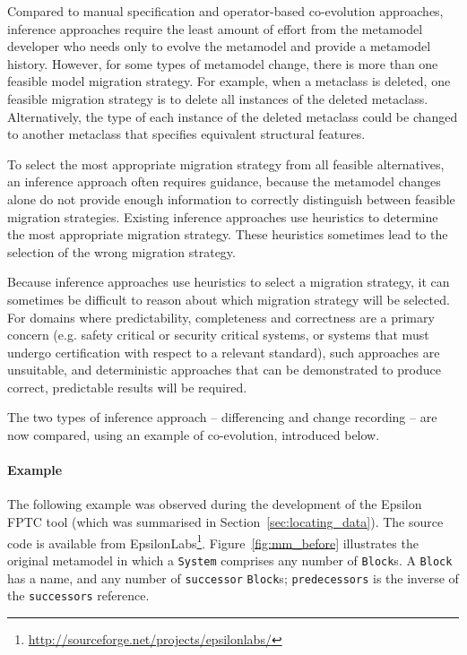 Compared to manual specification and operator-based co-evolution approaches, inference approaches require the least amount of effort from the metamodel developer who needs only to evolve the metamodel and provide a metamodel history. However, for some types of metamodel change, there is more than one feasible model migration strategy. For example, when a metaclass is deleted, one feasible migration strategy is to delete all instances of the deleted metaclass. Alternatively, the type of each instance of the deleted metaclass could be changed to another metaclass that specifies equivalent structural features.

To select the most appropriate migration strategy from all feasible alternatives, an inference approach often requires guidance, because the metamodel changes alone do not provide enough information to correctly distinguish between feasible migration strategies. Existing inference approaches use heuristics to determine the most appropriate migration strategy. These heuristics sometimes lead to the selection of the wrong migration strategy.

Because inference approaches use heuristics to select a migration strategy, it can sometimes be difficult to reason about which migration strategy will be selected. For domains where predictability, completeness and correctness are a primary concern (e.g. safety critical or security critical systems, or systems that must undergo certification with respect to a relevant standard), such approaches are unsuitable, and deterministic approaches that can be demonstrated to produce correct, predictable results will be required. 

The two types of inference approach -- differencing and change recording -- are now compared, using an example of co-evolution, introduced below.

\paragraph{Example}
\label{subsubsec:example}
The \cc following example was observed during the development of the Epsilon FPTC tool \cite{paige08fptc} (which was summarised in Section~\ref{sec:locating_data}). The source code is available from EpsilonLabs\footnote{\url{http://sourceforge.net/projects/epsilonlabs/}}. Figure~\ref{fig:mm_before} illustrates the original metamodel in which a \texttt{System} comprises any number of \texttt{Block}s. A \texttt{Block} has a name, and any number of \texttt{successor} \texttt{Block}s; \texttt{predecessors} is the inverse of the \texttt{successors} reference.

